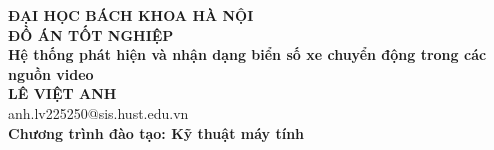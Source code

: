 \documentclass[DoAn.tex]{subfiles}
\begin{document}
\begin{titlepage}
\thispagestyle{empty}
\begin{center}

{\textbf{\large{ĐẠI HỌC BÁCH KHOA HÀ NỘI}}}\\[3cm]

{\textbf{\huge{ ĐỒ ÁN TỐT NGHIỆP}}}\\[1cm]
{\textbf{\Large{Hệ thống phát hiện và nhận dạng biển số xe chuyển động trong các nguồn video}}}\\[1cm]

{\textbf{\large{LÊ VIỆT ANH}}}\\
{\large{anh.lv225250@sis.hust.edu.vn}}\\[0.5cm]

{\textbf{\large{Chương trình đào tạo: Kỹ thuật máy tính
}}}\\

\vfill
\begin{table}[H]
\centering
{}
\end{table}
\end{center}



\end{titlepage}
\end{document}
